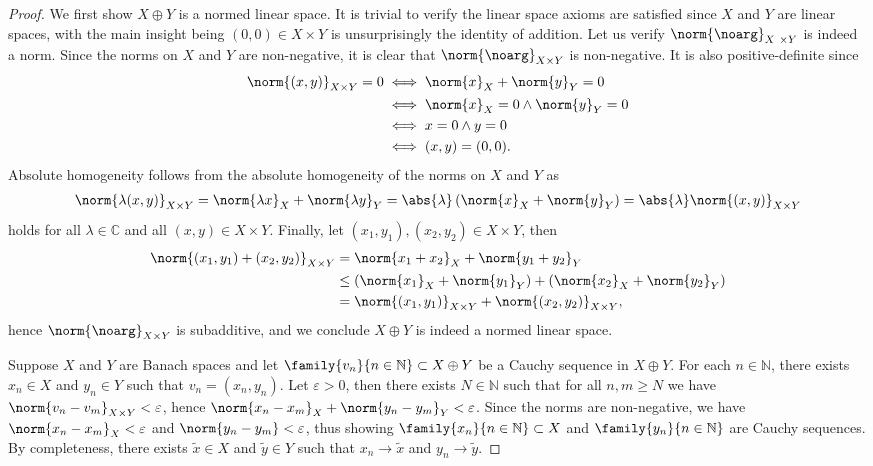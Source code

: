 \begin{proof}
    We first show \(X \oplus Y\) is a normed linear space. It is trivial to verify the linear space axioms are satisfied since \(X\) and \(Y\) are linear spaces, with the main insight being \((0,0) \in X\times Y\) is unsurprisingly the identity of addition. Let us verify \(\norm{\noarg}_{X\ \times Y}\) is indeed a norm. Since the norms on \(X\) and \(Y\) are non-negative, it is clear that \(\norm{\noarg}_{X\times Y}\) is non-negative. It is also positive-definite since
    \begin{align*}
        \norm{(x, y)}_{X \times Y} = 0 &\iff \norm{x}_X + \norm{y}_{Y} = 0\\
                                       &\iff \norm{x}_X = 0 \land \norm{y}_Y = 0\\
                                       &\iff x = 0 \land y = 0\\
                                       &\iff (x,y) = (0,0).
    \end{align*}
    Absolute homogeneity follows from the absolute homogeneity of the norms on \(X\) and \(Y\) as
    \begin{align*}
        \norm{\lambda (x, y)}_{X \times Y} = \norm{\lambda x}_X + \norm{\lambda y}_Y = \abs{\lambda} \left(\norm{x}_X + \norm{y}_Y\right) = \abs{\lambda} \norm{(x,y)}_{X \times Y}
    \end{align*}
    holds for all \(\lambda \in \mathbb{C}\) and all \((x,y) \in X \times Y\). Finally, let \((x_1, y_1), (x_2, y_2) \in X\times Y\), then
    \begin{align*}
        \norm{(x_1, y_1) + (x_2, y_2)}_{X \times Y} &= \norm{x_1 + x_2}_X + \norm{y_1 + y_2}_Y\\ &\leq \left(\norm{x_1}_X + \norm{y_1}_Y\right) + \left(\norm{x_2}_X + \norm{y_2}_Y\right) \\&= \norm{(x_1, y_1)}_{X \times Y} + \norm{(x_2, y_2)}_{X\times Y},
    \end{align*}
    hence \(\norm{\noarg}_{X\times Y}\) is subadditive, and we conclude \(X \oplus Y\) is indeed a normed linear space.

    Suppose \(X\) and \(Y\) are Banach spaces and let \(\family{v_n}{n \in \mathbb{N}} \subset X \oplus Y\) be a Cauchy sequence in \(X \oplus Y\). For each \(n \in \mathbb{N}\), there exists \(x_n \in X\) and \(y_n \in Y\) such that \(v_n = (x_n, y_n)\). Let \(\varepsilon > 0\), then there exists \(N \in \mathbb{N}\) such that for all \(n, m \geq N\) we have \(\norm{v_n - v_m}_{X \times Y} < \varepsilon\), hence \(\norm{x_n - x_m}_X + \norm{y_n - y_m}_Y < \varepsilon\). Since the norms are non-negative, we have \(\norm{x_n - x_m}_X < \varepsilon\) and \(\norm{y_n - y_m} < \varepsilon\), thus showing \(\family{x_n}{n \in \mathbb{N}} \subset X\) and \(\family{y_n}{n \in \mathbb{N}}\) are Cauchy sequences. By completeness, there exists \(\tilde{x} \in X\) and \(\tilde{y} \in Y\) such that \(x_n \to \tilde{x}\) and \(y_n \to \tilde{y}\).


\end{proof}

